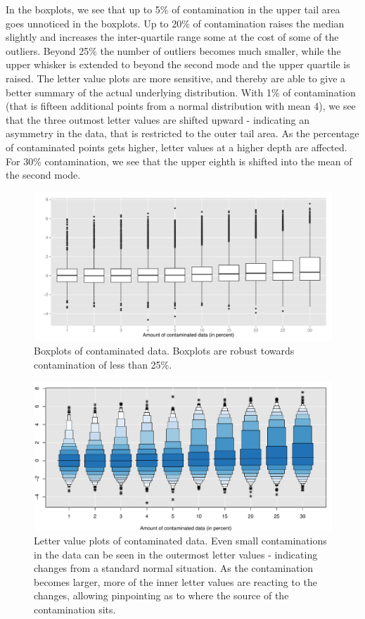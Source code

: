\documentclass[12pt,oneside]{article}
\begin{document}
In the boxplots, we see that up to 5\% of contamination in the upper tail area goes unnoticed in the boxplots.  Up to 20\% of contamination raises the median slightly and increases the inter-quartile range some at the cost of some of the outliers. Beyond 25\% the number of outliers becomes much smaller, while the upper whisker is extended to beyond the second mode and the upper quartile is raised. 
The letter value plots are more sensitive, and thereby are able to give a better summary of the actual underlying distribution.
With 1\% of contamination (that is fifteen additional points from a normal distribution with mean 4), we see that the  three outmost letter values are shifted upward - indicating an asymmetry in the data, that is restricted to the outer tail area. As the percentage of contaminated points gets higher, letter values at a higher depth are affected. For 30\% contamination, we see that the upper eighth is shifted into the mean of the second mode. 
\begin{figure}[htbp] %
   \centering
   \includegraphics[width=.8\linewidth]{xpl-boxplot} 
   \caption{Boxplots of contaminated data. Boxplots are robust towards contamination of less than 25\%.}
   \label{fig:xpl:boxplot}
\end{figure}

\begin{figure}[htbp] %
   \centering
   \includegraphics[width=.8\linewidth]{xpl-lvplot} 
   \caption{Letter value plots of contaminated data. Even small contaminations in the data can be seen in the outermost letter values - indicating changes from a standard normal situation. As the contamination becomes larger, more of the inner letter values are reacting to the changes, allowing pinpointing as to where the source of the contamination sits.}
   \label{fig:xpl:lvplot}
\end{figure}
\end{document}

